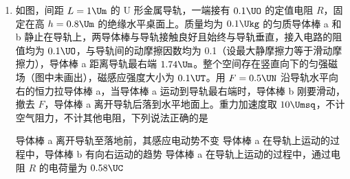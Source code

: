 \documentclass[\gkver]{gaokaozhenti}
\begin{document}
\begin{enumerate}
{A 错误；

B．飞行器以 $v_{3} = 5\Ums$ 匀速水平飞行时

$F = \sqrt{(Mg)^{2} + (kv_{3}^{2})^{2}} = \frac{\sqrt{17}}{4}Mg$

B 正确；

C．发动机以最大推力推动飞行器匀速水平飞行时

$f = \sqrt{F_{m}^{2} - (Mg)^{2}} = \frac{3}{4}Mg = kv_{4}^{2}$

解得 $v_{4} = 5\sqrt{3}\Ums$。C 正确；

D．当飞行器最大推力向下，以 $v_{5} = 5\Ums$ 的速率向上减速飞行时，其加速度向下达到最大值

$F_{m} + Mg + kv_{5}^{2} = Ma_{m}$

解得 $a_{m} = 2.5g$。D 错误。

故选 BC。
}

\item
如图，间距 $L = 1\Um$ 的 U 形金属导轨，一端接有 $0.1\UO$ 的定值电阻 $R$，固定在高 $h = 0.8\Um$ 的绝缘水平桌面上。质量均为 $0.1\Ukg$ 的匀质导体棒 a 和 b 静止在导轨上，两导体棒与导轨接触良好且始终与导轨垂直，接入电路的阻值均为 $0.1\UO$，与导轨间的动摩擦因数均为 0.1（设最大静摩擦力等于滑动摩擦力），导体棒 a 距离导轨最右端 $1.74\Um$。整个空间存在竖直向下的匀强磁场（图中未画出），磁感应强度大小为 $0.1\UT$。用 $F = 0.5\UN$ 沿导轨水平向右的恒力拉导体棒 a，当导体棒 a 运动到导轨最右端时，导体棒 b 刚要滑动，撤去 $F$，导体棒 a 离开导轨后落到水平地面上。重力加速度取 $10\Umsq$，不计空气阻力，不计其他电阻，下列说法正确的是


{导体棒 a 离开导轨至落地前，其感应电动势不变}
{导体棒 a 在导轨上运动的过程中，导体棒 b 有向右运动的趋势}
{导体棒 a 在导轨上运动的过程中，通过电阻 $R$ 的电荷量为 $0.58\UC$}

\end{enumerate}
\end{document}
